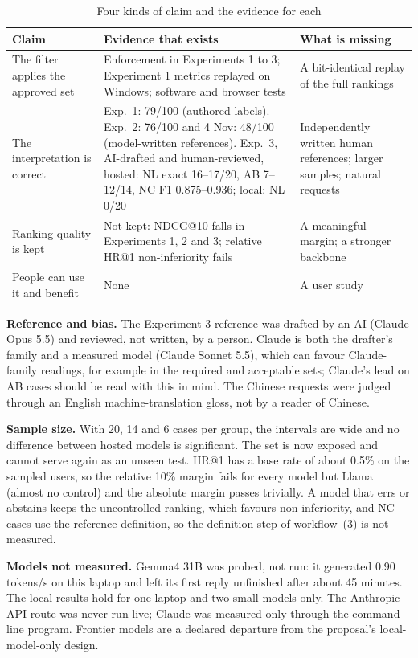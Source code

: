 \documentclass[conference]{IEEEtran}
\begin{document}
\begin{table}[t]\centering\footnotesize
\caption{Four kinds of claim and the evidence for each}\label{tab:claims}
\setlength{\tabcolsep}{4pt}
\begin{tabular}{L{1.5cm}L{3.95cm}L{2.4cm}}\toprule
Claim&Evidence that exists&What is missing\\\midrule
The filter applies the approved set&Enforcement in Experiments 1 to 3; Experiment 1 metrics replayed on Windows; software and browser tests&A bit-identical replay of the full rankings\\
The interpretation is correct&Exp.~1: 79/100 (authored labels). Exp.~2: 76/100 and 4 Nov: 48/100 (model-written references). Exp.~3, AI-drafted and human-reviewed, hosted: NL exact 16--17/20, AB 7--12/14, NC F1 0.875--0.936; local: NL 0/20&Independently written human references; larger samples; natural requests\\
Ranking quality is kept&Not kept: NDCG@10 falls in Experiments 1, 2 and 3; relative HR@1 non-inferiority fails&A meaningful margin; a stronger backbone\\
People can use it and benefit&None&A user study\\\bottomrule
\end{tabular}\end{table}

\textbf{Reference and bias.} The Experiment 3 reference was drafted by an AI (Claude Opus 5.5) and reviewed, not written, by a person. Claude is both the drafter's family and a measured model (Claude Sonnet 5.5), which can favour Claude-family readings, for example in the required and acceptable sets; Claude's lead on AB cases should be read with this in mind. The Chinese requests were judged through an English machine-translation gloss, not by a reader of Chinese.

\textbf{Sample size.} With 20, 14 and 6 cases per group, the intervals are wide and no difference between hosted models is significant. The set is now exposed and cannot serve again as an unseen test. HR@1 has a base rate of about 0.5\% on the sampled users, so the relative 10\% margin fails for every model but Llama (almost no control) and the absolute margin passes trivially. A model that errs or abstains keeps the uncontrolled ranking, which favours non-inferiority, and NC cases use the reference definition, so the definition step of workflow~(3) is not measured.

\textbf{Models not measured.} Gemma4 31B was probed, not run: it generated 0.90 tokens/s on this laptop and left its first reply unfinished after about 45 minutes. The local results hold for one laptop and two small models only. The Anthropic API route was never run live; Claude was measured only through the command-line program. Frontier models are a declared departure from the proposal's local-model-only design.
\end{document}
